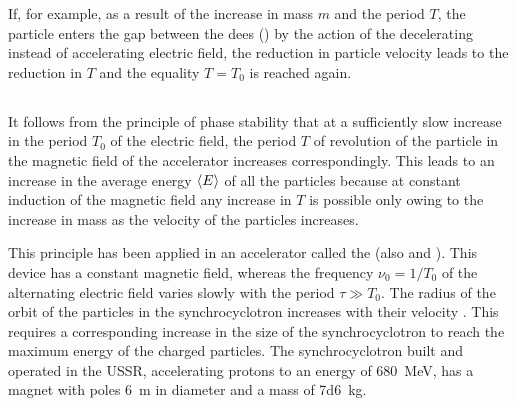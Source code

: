 If, for example, as a result of the increase in mass $m$ and the period $T$, the particle enters the gap between the dees () by the action of the decelerating instead of accelerating electric field, the reduction in particle velocity leads to the reduction in $T$ and the equality $T = T_{0}$ is reached again.

\subsection{}\label{24.4.8} It follows from the principle of phase stability  that at a sufficiently slow increase in the period $T_{0}$ of the elec­tric field, the period $T$ of revolution of the particle in the magnetic field of the accelerator increases correspondingly. This leads to an increase in the average energy $\expval{E}$ of all the particles because at constant induction of the magnetic field any increase in $T$ is possible only owing to the increase in mass as the velocity of the particles increases.

This principle has been applied in an accelerator called the  (also  and ). This device has a constant magnetic field, whereas the frequency $\nu_{0}= 1/T_{0}$  of the alternating electric field varies slowly with the period $\tau \gg T_{0}$. The radius of the orbit of the particles in the synchrocyclotron increases with their velocity . This requires a corresponding increase in the size of the synchrocyclotron to reach the maximum energy of the charged particles. The synchrocyclotron built and operated in the USSR, accelerating protons to an energy of \SI{680}{\mega\electronvolt},
has a magnet with poles \SI{6}{\meter} in diameter and a mass of \SI{7d6}{\kilo\gram}.

